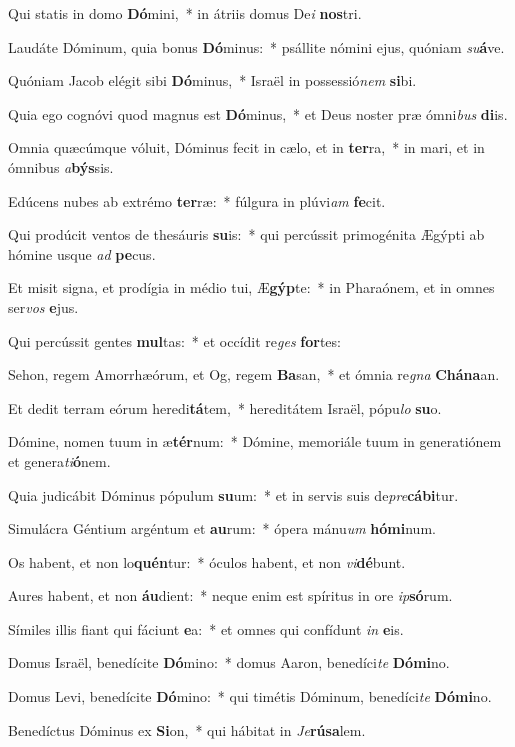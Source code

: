 \item Qui statis in domo \textbf{Dó}mini,~* in átriis domus De\textit{i} \textbf{nos}tri.
\item Laudáte Dóminum, quia bonus \textbf{Dó}minus:~* psállite nómini ejus, quóniam \textit{su}\textbf{á}ve.
\item Quóniam Jacob elégit sibi \textbf{Dó}minus,~* Israël in possessió\textit{nem} \textbf{si}bi.
\item Quia ego cognóvi quod magnus est \textbf{Dó}minus,~* et Deus noster præ ómni\textit{bus} \textbf{di}is.
\item Omnia quæcúmque vóluit, Dóminus fecit in cælo, et in \textbf{ter}ra,~* in mari, et in ómnibus \textit{a}\textbf{býs}sis.
\item Edúcens nubes ab extrémo \textbf{ter}ræ:~* fúlgura in plúvi\textit{am} \textbf{fe}cit.
\item Qui prodúcit ventos de thesáuris \textbf{su}is:~* qui percússit primogénita Ægýpti ab hómine usque \textit{ad} \textbf{pe}cus.
\item Et misit signa, et prodígia in médio tui, Æ\textbf{gýp}te:~* in Pharaónem, et in omnes ser\textit{vos} \textbf{e}jus.
\item Qui percússit gentes \textbf{mul}tas:~* et occídit re\textit{ges} \textbf{for}tes:
\item Sehon, regem Amorrhæórum, et Og, regem \textbf{Ba}san,~* et ómnia re\textit{gna} \textbf{Chá}\textbf{na}an.
\item Et dedit terram eórum heredi\textbf{tá}tem,~* hereditátem Israël, pópu\textit{lo} \textbf{su}o.
\item Dómine, nomen tuum in æ\textbf{tér}num:~* Dómine, memoriále tuum in generatiónem et genera\textit{ti}\textbf{ó}nem.
\item Quia judicábit Dóminus pópulum \textbf{su}um:~* et in servis suis de\textit{pre}\textbf{cá}\textbf{bi}tur.
\item Simulácra Géntium argéntum et \textbf{au}rum:~* ópera mánu\textit{um} \textbf{hó}\textbf{mi}num.
\item Os habent, et non lo\textbf{quén}tur:~* óculos habent, et non \textit{vi}\textbf{dé}bunt.
\item Aures habent, et non \textbf{áu}dient:~* neque enim est spíritus in ore \textit{ip}\textbf{só}rum.
\item Símiles illis fiant qui fáciunt \textbf{e}a:~* et omnes qui confídunt \textit{in} \textbf{e}is.
\item Domus Israël, benedícite \textbf{Dó}mino:~* domus Aaron, benedíci\textit{te} \textbf{Dó}\textbf{mi}no.
\item Domus Levi, benedícite \textbf{Dó}mino:~* qui timétis Dóminum, benedíci\textit{te} \textbf{Dó}\textbf{mi}no.
\item Benedíctus Dóminus ex \textbf{Si}on,~* qui hábitat in \textit{Je}\textbf{rú}\textbf{sa}lem.
